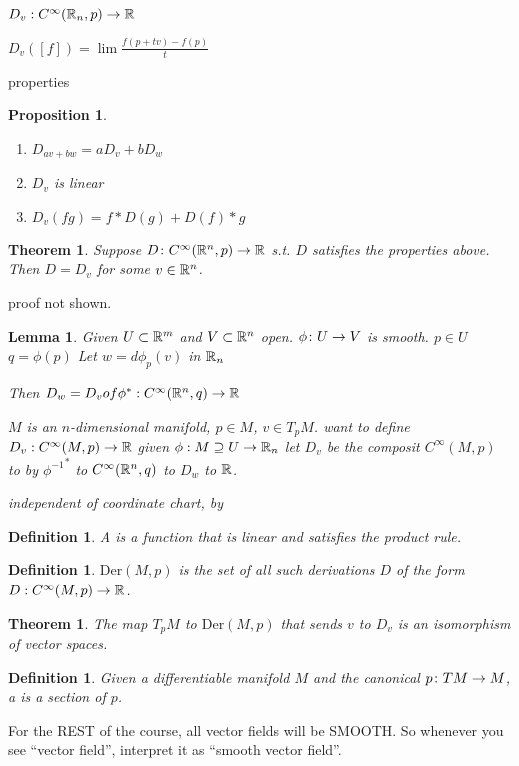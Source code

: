 \documentclass[11pt]{amsbook}
\newenvironment{dateenv}{
	\vspace{1em}
}{
	\vspace{1em}
}
\newcommand{\mydate}[4]{
	\newdate{#1}{#2}{#3}{#4}
	\begin{dateenv}
		\hfill\displaydate{#1}
	\end{dateenv}
}
\theoremstyle{mystyle} %
\newtheorem{thrm}[thm]{Theorem}
\newtheorem{defi}[thm]{Definition}
\newtheorem{propo}[thm]{Proposition}
\newtheorem{lemm}[thm]{Lemma}
\numberwithin{thm}{section}
\newcommand{\Der}{\text{Der}}
\begin{document}
$D_v : C^\infty({\mathbb R}_n, p) \to {\mathbb R}$

$D_v([f]) = \lim \frac{f(p + tv) - f(p)}{t}$

properties
\begin{propo}
	\mbox{}
	\begin{enumerate}
		\item $D_{av + bw} = aD_{v} + bD_{w}$
		\item $D_v$ is linear
		\item $D_v(fg) = f*D(g) + D(f)*g$
	\end{enumerate}
\end{propo}
\begin{thrm}
	Suppose $D \colon C^\infty({\mathbb R}^n,p) \to {\mathbb R}$
	s.t. $D$ satisfies the properties above.  Then $D = D_v$ for some $v \in {\mathbb R}^n$.
\end{thrm}
proof not shown.
\begin{lemm}
	Given $U \subset {\mathbb R}^m$ and $V \subset {\mathbb R}^n$ open.
	$\phi \colon U \to V$ is smooth.
	$p \in U$
	$q = \phi(p)$
	Let
	$w = d \phi_p(v)$ in ${\mathbb R}_n$

	Then
	$D_w = D_v of \phi^* : C^\infty({\mathbb R}^n,q) \to {\mathbb R}$

	$M$ is an $n$-dimensional manifold, $p \in M$, $v \in T_pM$.
	want to define
	$D_v : C^\infty(M,p) \to {\mathbb R}$
	given $\phi: M \supseteq U \to {\mathbb R}_n$ let $D_v$ be the composit
	$C^\infty(M, p)$ to by ${\phi^{-1}}^*$ to $C^\infty({\mathbb R}^n,q)$ to $D_w$ to ${\mathbb R}$.

	independent of coordinate chart, by
\end{lemm}
\begin{defi}
	A  is a function that is linear and satisfies the product rule.
\end{defi}
\begin{defi}
	$\Der(M,p)$ is the set of all such derivations $D$ of the form $D: C^\infty(M,p) \to {\mathbb R}$.
\end{defi}
\begin{thrm}
	The map $T_pM$ to $\Der(M,p)$
	that sends $v$ to $D_v$
	is an isomorphism of vector spaces.
\end{thrm}

\mydate{d5}{10}{10}{2016}

\begin{defi}
	Given a differentiable manifold $M$ and the canonical $p\colon TM \to M$, a  is a section of $p$.
\end{defi}
\begin{rmk}
	For the REST of the course, all vector fields will be SMOOTH.  So whenever you see ``vector field'', interpret it as ``smooth vector field''.
\end{rmk}
\end{document}
